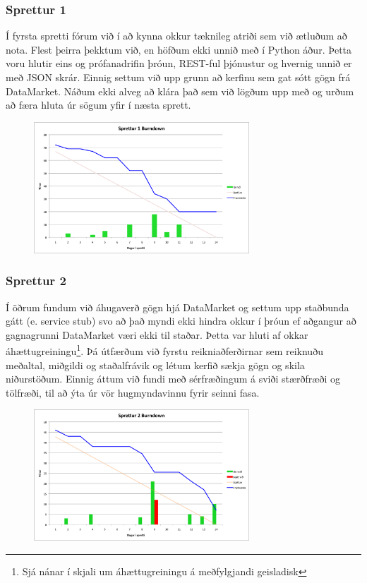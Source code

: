 \documentclass{article}
\begin{document}
\subsubsection{Sprettur 1}
Í fyrsta spretti fórum við í að kynna okkur tæknileg atriði sem við ætluðum að
nota.
Flest þeirra þekktum við, en höfðum ekki unnið með í Python áður. Þetta voru hlutir
eins og prófanadrifin þróun, REST-ful þjónustur og hvernig 
unnið er með JSON skrár. Einnig settum við upp grunn að kerfinu sem gat sótt
gögn frá DataMarket. Náðum ekki alveg að klára það sem við lögðum 
upp með og urðum að færa hluta úr sögum yfir í næsta sprett.
\begin{figure}[H]
  \centering
  \includegraphics[width=0.72\textwidth]{Sprettur1_Burndown.png}
  \caption{}
\end{figure}

\subsubsection{Sprettur 2}
Í öðrum fundum við áhugaverð gögn hjá DataMarket og settum upp staðbunda
gátt (e. service stub) svo að það myndi ekki hindra okkur í þróun ef 
aðgangur að gagnagrunni DataMarket væri ekki til staðar. Þetta var hluti af
okkar áhættugreiningu\footnote[1]{Sjá nánar í skjali um áhættugreiningu á meðfylgjandi geisladisk}. 
Þá útfærðum við fyrstu reikniaðferðirnar sem reiknuðu meðaltal, miðgildi og staðalfrávik
og létum kerfið sækja gögn og skila niðurstöðum.
Einnig áttum við fundi með sérfræðingum á sviði stærðfræði og tölfræði, til að ýta
úr vör hugmyndavinnu fyrir seinni fasa.
\begin{figure}[H]
 \centering
 \includegraphics[width=0.72\textwidth]{Sprettur2_Burndown.png}
 \caption{}
\end{figure}
\end{document}
